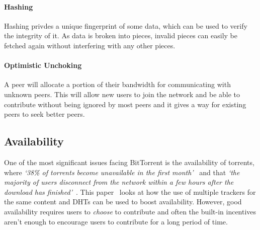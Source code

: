 \paragraph*{Hashing}
Hashing privdes a unique fingerprint of some data, which can be used to verify the integrity of it. As data is broken into pieces, invalid pieces can easily be fetched again without interfering with any other pieces.

\paragraph*{Optimistic Unchoking}
A peer will allocate a portion of their bandwidth for communicating with unknown peers. This will allow new users to join the network and be able to contribute without being ignored by most peers and it gives a way for existing peers to seek better peers.

\subsection*{Availability}\label{subsec:availability}

One of the most significant issues facing BitTorrent is the availability of torrents, where \textit{`38\% of torrents become unavailable in the first month'}~\cite{kaune_unraveling_2010} and that \textit{`the majority of users disconnect from the network within a few hours after the download has finished'}~\cite{pouwelse_bittorrent_2005}.
This paper~\cite{neglia_availability_2007} looks at how the use of multiple trackers for the same content and DHTs can be used to boost availability. 
However, good availability requires users to \textit{choose} to contribute and often the built-in incentives aren't enough to encourage users to contribute for a long period of time.
